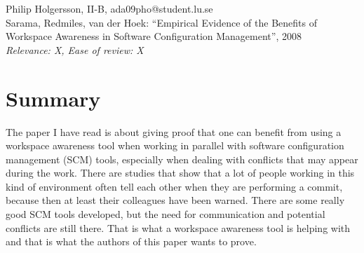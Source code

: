 \documentclass[a4paper]{article}
\begin{document}

Philip Holgersson, II-B, ada09pho@student.lu.se\\
Sarama, Redmiles, van der Hoek: ``Empirical Evidence of the Benefits of Workspace Awareness in Software Configuration Management'', 2008 \\
\textit{Relevance: X, Ease of review: X}

\section*{Summary}
The paper I have read is about giving proof that one can benefit from using a workspace awareness tool when working in parallel with software configuration management (SCM) tools, especially when dealing with conflicts that may appear during the work. There are studies that show that a lot of people working in this kind of environment often tell each other when they are performing a commit, because then at least their colleagues have been warned. There are some really good SCM tools developed, but the need for communication and potential conflicts are still there. That is what a workspace awareness tool is helping with and that is what the authors of this paper wants to prove.
\end{document}
